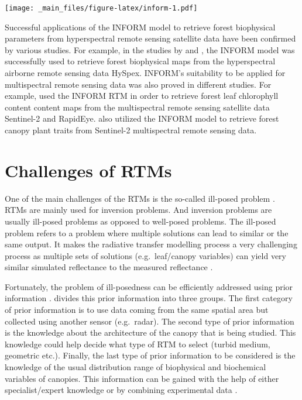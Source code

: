 \documentclass[a4paper, twoside]{templates/ociamthesis}
\let\origfigure\figure
\let\endorigfigure\endfigure
\renewenvironment{figure}[1][2] {
    \expandafter\origfigure\expandafter[H]
} {
    \endorigfigure
}
\begin{document}
\begin{figure}
\centering
\texttt{[image: \_main\_files/figure-latex/inform-1.pdf]}
\caption{\label{fig:inform}Visualization of the INFORM model as a combination of PROSPECT5, 4SAIL and FLIM in the forward mode}
\end{figure}

Successful applications of the INFORM model to retrieve forest biophysical parameters from hyperspectral remote sensing satellite data have been confirmed by various studies. For example, in the studies by \citet{ali2016retrieval} and \citet{wang2017canopy}, the INFORM model was successfully used to retrieve forest biophysical maps from the hyperspectral airborne remote sensing data HySpex. INFORM's suitability to be applied for multispectral remote sensing data was also proved in different studies. For example, \citet{darvishzadeh2019mapping} used the INFORM RTM in order to retrieve forest leaf chlorophyll content content maps from the multispectral remote sensing satellite data Sentinel-2 and RapidEye. \citet{ali2020machine} also utilized the INFORM model to retrieve forest canopy plant traits from Sentinel-2 multispectral remote sensing data.

\hypertarget{chrtm}{%
\section{Challenges of RTMs}\label{chrtm}}

One of the main challenges of the RTMs is the so-called ill-posed problem \citep{combal2003retrieval, zhu2019estimation}. RTMs are mainly used for inversion problems. And inversion problems are usually ill-posed problems as opposed to well-posed problems. The ill-posed problem refers to a problem where multiple solutions can lead to similar or the same output. It makes the radiative transfer modelling process a very challenging process as multiple sets of solutions (e.g.~leaf/canopy variables) can yield very similar simulated reflectance to the measured reflectance \citep{combal2003retrieval, darvishzadeh2008estimation, zhu2019estimation}.

Fortunately, the problem of ill-posedness can be efficiently addressed using prior information \citep{combal2003retrieval, darvishzadeh2008estimation, zhu2019estimation}. \citet{combal2003retrieval} divides this prior information into three groups. The first category of prior information is to use data coming from the same spatial area but collected using another sensor (e.g.~radar). The second type of prior information is the knowledge about the architecture of the canopy that is being studied. This knowledge could help decide what type of RTM to select (turbid medium, geometric etc.). Finally, the last type of prior information to be considered is the knowledge of the usual distribution range of biophysical and biochemical variables of canopies. This information can be gained with the help of either specialist/expert knowledge or by combining experimental data \citep{combal2003retrieval}.
\end{document}
